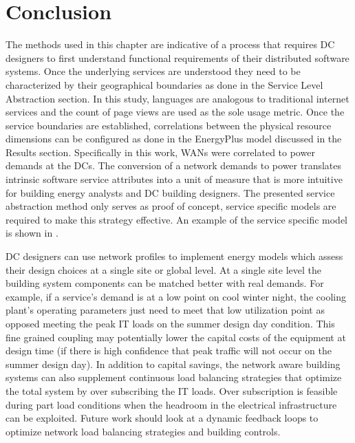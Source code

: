     
    
\section{Conclusion}
    The methods used in this chapter are indicative of a process that requires DC designers to first understand functional requirements of their distributed software systems. Once the underlying services are understood they need to be characterized by their geographical boundaries as done in the Service Level Abstraction section. In this study, languages are analogous to traditional internet services and the count of page views are used as the sole usage metric. Once the service boundaries are established, correlations between the physical resource dimensions can be configured as done in the EnergyPlus model discussed in the Results section. Specifically in this work, WANs were correlated to power demands at the DCs. The conversion of a network demands to power translates intrinsic software service attributes into a unit of measure that is more intuitive for building energy analysts and DC building designers. The presented service abstraction method only serves as proof of concept, service specific models are required to make this strategy effective. An example of the service specific model is shown in \cite{zhuang15}.

    DC designers can use network profiles to implement energy models which assess their design choices at a single site or global level. At a single site level the building system components can be matched better with real demands. For example, if a service’s demand is at a low point on cool winter night, the cooling plant’s operating parameters just need to meet that low utilization point as opposed meeting the peak IT loads on the summer design day condition. This fine grained coupling may potentially lower the capital costs of the equipment at design time (if there is high confidence that peak traffic will not occur on the summer design day). In addition to capital savings, the network aware building systems can also supplement continuous load balancing strategies that optimize the total system by over subscribing the IT loads. Over subscription is feasible during part load conditions when the headroom in the electrical infrastructure can be exploited. Future work should look at a dynamic feedback loops to optimize network load balancing strategies and building controls. 
